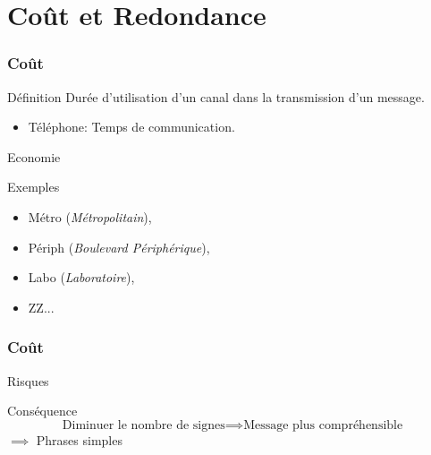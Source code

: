 \section{Coût et Redondance}

\begin{frame}
	\frametitle{Coût}
	\begin{block}{Définition}
		Durée d'utilisation d'un canal dans la transmission d'un message.
		\begin{itemize}
			\item Téléphone: Temps de communication.
		\end{itemize}
	\end{block}
	\begin{alertblock}{Economie}
		\centering
	\end{alertblock}
	\begin{exampleblock}{Exemples}
		\begin{itemize}
			\item Métro (\emph{Métropolitain}),
			\item Périph (\emph{Boulevard Périphérique}),
			\item Labo (\emph{Laboratoire}),
			\item ZZ...
		\end{itemize}
	\end{exampleblock}
\end{frame}

\begin{frame}
	\frametitle{Coût}
	\begin{alertblock}{Risques}
		\centering
	\end{alertblock}
	\begin{exampleblock}{Conséquence}
		\[ \text{Diminuer le nombre de signes} \implies \text{Message plus compréhensible} \]
		$\implies$ Phrases simples
	\end{exampleblock}
\end{frame} 
